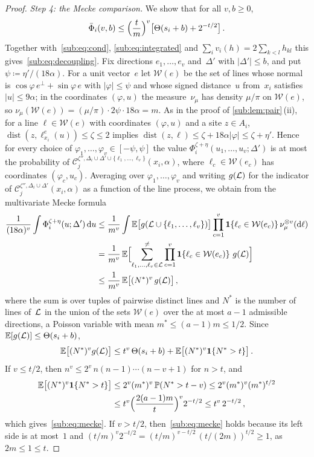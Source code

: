 \documentclass[11pt,letterpaper]{article}
\DeclareMathOperator{\dist}{dist}
\newcommand{\cW}{\mathcal W}
\newcommand{\cC}{\mathcal C}
\begin{document}
\begin{proof}
\emph{Step 4: the Mecke comparison.} We show that for all $v,b\ge0$,
\begin{equation}
\label{sub:eq:mecke}
  \bar\Phi_i(v,b)\le\Bigl(\frac tm\Bigr)^{v}\bigl[\Theta(s_i+b)+2^{-t/2}\bigr]\,.
\end{equation}
Together with~\eqref{sub:eq:cond}, \eqref{sub:eq:integrated} and $\sum_iv_i(h)=2\sum_{k<l}h_{kl}$ this gives~\eqref{sub:eq:decoupling}. Fix directions $e_1,\dots,e_v$ and~$\Delta'$ with $\lvert\Delta'\rvert\le b$, and put $\psi\coloneqq\eta'/(18\alpha)$. For a unit vector~$e$ let $\cW(e)$ be the set of lines whose normal is $\cos\varphi\,e^\perp+\sin\varphi\,e$ with $\lvert\varphi\rvert\le\psi$ and whose signed distance~$u$ from~$x_i$ satisfies $\lvert u\rvert\le9\alpha$; in the coordinates $(\varphi,u)$ the measure~$\nu_\mu$ has density $\mu/\pi$ on $\cW(e)$, so $\nu_\mu(\cW(e))=(\mu/\pi)\cdot2\psi\cdot18\alpha=m$. As in the proof of \cref{sub:lem:pair}\,(ii), for a line $\ell\in\cW(e)$ with coordinates $(\varphi,u)$ and a site $z\in A_i$, $\dist(z,\ell^e_{x_i}(u))\le\zeta\le2$ implies $\dist(z,\ell)\le\zeta+18\alpha\lvert\varphi\rvert\le\zeta+\eta'$. Hence for every choice of $\varphi_1,\dots,\varphi_v\in[-\psi,\psi]$ the value $\Phi_i^{\zeta+\eta}(u_1,\dots,u_v;\Delta')$ is at most the probability of $\cC_j^{\zeta'',\Delta_i\cup\Delta'\cup\{\ell_1,\dots,\ell_v\}}(x_i,\alpha)$, where $\ell_c\in\cW(e_c)$ has coordinates $(\varphi_c,u_c)$. Averaging over $\varphi_1,\dots,\varphi_v$ and writing $g(\mathcal L)$ for the indicator of $\cC_j^{\zeta'',\Delta_i\cup\Delta'}(x_i,\alpha)$ as a function of the line process, we obtain from the multivariate Mecke formula~\cite[Theorem~4.4]{LP17}
\begin{align*}
  \frac1{(18\alpha)^{v}}\int\Phi_i^{\zeta+\eta}(u;\Delta')\dd u
  &\le\frac1{m^v}\int\E\bigl[g(\cL\cup\{\ell_1,\dots,\ell_v\})\bigr]\prod_{c=1}^v\1\{\ell_c\in\cW(e_c)\}\,\nu_\mu^{\otimes v}(\d\ell)\\
  &=\frac1{m^v}\,\E\Bigl[\sum^{\neq}_{\ell_1,\dots,\ell_v\in\cL}\prod_{c=1}^v\1\{\ell_c\in\cW(e_c)\}\ g(\cL)\Bigr]\\
  &\le\frac1{m^v}\,\E\bigl[(N^*)^v\,g(\cL)\bigr]\,,
\end{align*}
where the sum is over tuples of pairwise distinct lines and $N^*$ is the number of lines of~$\mathcal L$ in the union of the sets $\cW(e)$ over the at most $a-1$ admissible directions, a Poisson variable with mean $m^*\le(a-1)m\le1/2$. Since $\mathbb E[g(\mathcal L)]\le\Theta(s_i+b)$,
\begin{equation*}
  \mathbb E\bigl[(N^*)^v g(\mathcal L)\bigr]\le t^v\,\Theta(s_i+b)+\mathbb E\bigl[(N^*)^v\mathbf{1}\{N^*>t\}\bigr]\,.
\end{equation*}
If $v\le t/2$, then $n^v\le2^v\,n(n-1)\cdots(n-v+1)$ for $n>t$, and
\begin{align*}
  \mathbb E\bigl[(N^*)^v\mathbf{1}\{N^*>t\}\bigr]&\le2^v(m^*)^v\,\mathbb P(N^*>t-v)\le2^v(m^*)^v(m^*)^{t/2}\\
  &\le t^v\Bigl(\frac{2(a-1)m}{t}\Bigr)^v2^{-t/2}\le t^v\,2^{-t/2}\,,
\end{align*}
which gives~\eqref{sub:eq:mecke}. If $v>t/2$, then~\eqref{sub:eq:mecke} holds because its left side is at most~$1$ and $(t/m)^v2^{-t/2}=(t/m)^{v-t/2}\,(t/(2m))^{t/2}\ge1$, as $2m\le1\le t$.
\end{proof}
\end{document}
